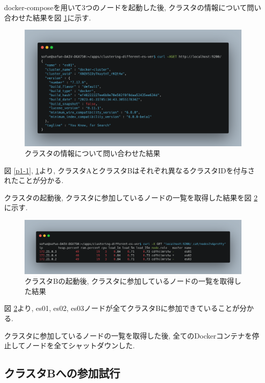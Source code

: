 docker-composeを用いて3つのノードを起動した後, クラスタの情報について問い合わせた結果を図 \ref{p2-1}に示す.

\begin{figure}[h]
  \begin{center}
    \includegraphics[width=160mm]{sotu/figure/3nodes-cluster.png}
    \caption{クラスタの情報について問い合わせた結果}
    \label{p2-1}
  \end{center}
\end{figure}

図 \ref{p1-1}, \ref{p2-1}より, クラスタAとクラスタBはそれぞれ異なるクラスタIDを付与されたことが分かる.

クラスタの起動後, クラスタに参加しているノードの一覧を取得した結果を図 \ref{p2-2}に示す.

\begin{figure}[h]
  \begin{center}
    \includegraphics[width=160mm]{sotu/figure/3nodes-list.png}
    \caption{クラスタBの起動後, クラスタに参加しているノードの一覧を取得した結果}
    \label{p2-2}
  \end{center}
\end{figure}

図 \ref{p2-2}より, es01, es02, es03ノードが全てクラスタBに参加できていることが分かる.

クラスタに参加しているノードの一覧を取得した後, 全てのDockerコンテナを停止してノードを全てシャットダウンした.

\subsection{クラスタBへの参加試行}

